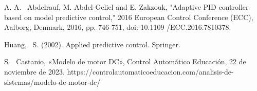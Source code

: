 \documentclass[journal]{IEEEtran}
\begin{document}

%
%
%
\begin{thebibliography}{1}

A. A. ~Abdelrauf, M. Abdel-Geliel and E. Zakzouk, "Adaptive PID controller based on model predictive control," 2016 European Control Conference (ECC), Aalborg, Denmark, 2016, pp. 746-751, doi: 10.1109 /ECC.2016.7810378.

Huang, ~S. (2002). Applied predictive control. Springer.

S. ~Castanio, «Modelo de motor DC», Control Automático Educación, 22 de noviembre de 2023. https://controlautomaticoeducacion.com/analisis-de-sistemas/modelo-de-motor-dc/
\end{thebibliography}

% 



\end{document}
